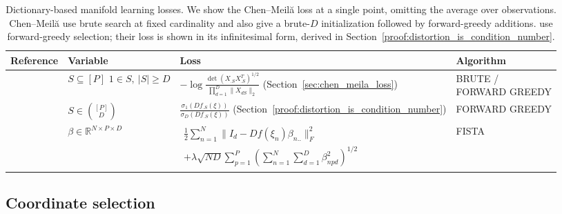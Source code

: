 \begin{table}[t]
\centering
\tiny
\setlength{\tabcolsep}{2pt}
\begin{tabular}{@{}>{\raggedright\arraybackslash}p{}>{\centering\arraybackslash}p{}>{\raggedright\arraybackslash}p{}>{\centering\arraybackslash}p{}@{}}
\toprule
\textbf{Reference} & \textbf{Variable} & \textbf{Loss} & \textbf{Algorithm} \\
\midrule
\citet{NEURIPS2019_6a10bbd4} & \makecell{$S \subseteq [P]$\\$1\in S,\ |S|\geq D$} & $\displaystyle
-\log
\frac{
\det\!\left(X_{.S}X_{.S}^T\right)^{1/2}
}{
\prod_{d=1}^D \|X_{dS}\|_2
}$ (Section~\ref{sec:chen_meila_loss})
 & \makecell{BRUTE /\\FORWARD GREEDY} \\
\citet{Kohli2021-lr} & $S \in \binom{[P]}{D}$ & $\displaystyle
\frac{\sigma_1(Df_{.S}(\xi))}{\sigma_D(Df_{.S}(\xi))}$ (Section~\ref{proof:distortion_is_condition_number}) & FORWARD GREEDY \\
\citet{Koelle2024-no} & $\beta \in \mathbb R^{N\times P\times D}$ & $\begin{aligned}
\frac{1}{2}\sum_{n=1}^N
\|I_d- Df (\xi_n) \beta_{n..} \|_F^2 \\ + \lambda \sqrt{ND}\sum_{p=1}^P
\left(\sum_{n=1}^N \sum_{d=1}^D \beta_{npd}^2\right)^{1/2}
\end{aligned}$ & FISTA \\
\bottomrule
\end{tabular}
\caption{Dictionary-based manifold learning losses.
We show the Chen--Meil\u{a} loss at a single point, omitting the average over observations.
Chen--Meil\u{a} use brute search at fixed cardinality and also give a brute-$D$ initialization followed by forward-greedy additions.
\citet{Kohli2021-lr} use forward-greedy selection; their loss is shown in its infinitesimal form, derived in Section~\ref{proof:distortion_is_condition_number}.}
\label{tab:losses}
\end{table}

\subsection{Coordinate selection}
\label{sec:sparse_convex_coordinate_selection}

